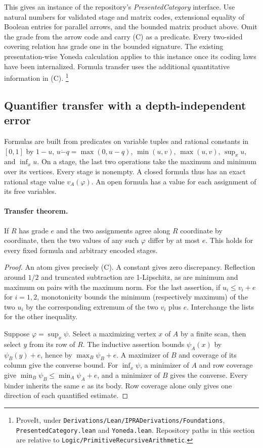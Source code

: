 This gives an instance of the repository's
\emph{PresentedCategory} interface. Use natural numbers for validated
stage and matrix codes, extensional equality of Boolean entries for
parallel arrows, and the bounded matrix product above. Omit the grade
from the arrow code and carry (C) as a predicate. Every two-sided covering
relation has grade one in the bounded signature. The existing
presentation-wise Yoneda calculation applies to this instance once
its coding laws have been internalized. Formula transfer uses the
additional quantitative information in (C).%
\footnote{ProveIt, under \nolinkurl{Derivations/Lean/IPRADerivations/Foundations},
\texttt{PresentedCategory.lean} and \texttt{Yoneda.lean}. Repository paths in
this section are relative to \nolinkurl{Logic/PrimitiveRecursiveArithmetic}.}

\subsection{Quantifier transfer with a depth-independent error}

Formulas are built from predicates on variable tuples and rational
constants in $[0,1]$ by $1-u$, $u\mathbin{\dot-}q=\max(0,u-q)$,
$\min(u,v)$, $\max(u,v)$, $\sup_x u$, and $\inf_x u$. On a stage,
the last two operations take the maximum and minimum over its vertices.
Every stage is nonempty. A closed formula thus has an exact rational
stage value $v_A(\varphi)$. An open formula has a value for each assignment
of its free variables.

\paragraph{Transfer theorem.}
If $R$ has grade $e$ and the two assignments agree along $R$ coordinate
by coordinate, then the two values of any such $\varphi$ differ by at most
$e$. This holds for every fixed formula and arbitrary encoded stages.

\begin{proof}
An atom gives precisely (C). A constant gives zero discrepancy. Reflection
around $1/2$ and truncated subtraction are 1-Lipschitz, as are minimum
and maximum on pairs with the maximum norm. For the last assertion, if
$u_i\leq v_i+e$ for $i=1,2$, monotonicity bounds the minimum (respectively
maximum) of the two $u_i$ by the corresponding extremum of the two $v_i$
plus $e$. Interchange the lists for the other inequality.

Suppose $\varphi=\sup_x\psi$. Select a maximizing vertex $x$ of $A$ by a
finite scan, then select $y$ from its row of $R$. The inductive assertion
bounds $\psi_A(x)$ by $\psi_B(y)+e$, hence by $\max_B\psi_B+e$.
A maximizer of $B$ and coverage of its column give the converse bound.
For $\inf_x\psi$, a minimizer of $A$ and row coverage give
$\min_B\psi_B\leq\min_A\psi_A+e$, and a minimizer of $B$ gives the converse.
Every binder inherits the same $e$ as its body. Row coverage alone only
gives one direction of each quantified estimate.
\end{proof}

